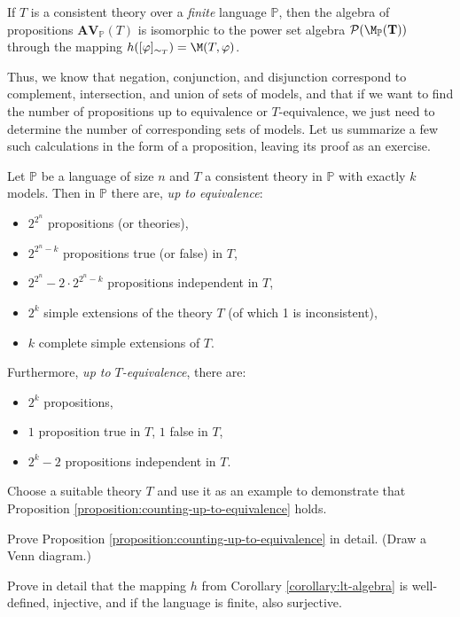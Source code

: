 \begin{corollary}\label{corollary:lt-algebra}
If $T$ is a consistent theory over a \emph{finite} language $\mathbb{P}$, then the algebra of propositions $\mathbf{AV}_\mathbb{P}(T)$ is isomorphic to the power set algebra $\mathbf{\mathcal{P}(\M_\mathbb{P}(T))}$ through the mapping $h([\varphi]_{\sim_T}) = \M(T,\varphi)$.
\end{corollary}

Thus, we know that negation, conjunction, and disjunction correspond to complement, intersection, and union of sets of models, and that if we want to find the number of propositions up to equivalence or $T$-equivalence, we just need to determine the number of corresponding sets of models. Let us summarize a few such calculations in the form of a proposition, leaving its proof as an exercise.

\begin{proposition}\label{proposition:counting-up-to-equivalence}
Let $\mathbb{P}$ be a language of size $n$ and $T$ a consistent theory in $\mathbb P$ with exactly $k$ models. Then in $\mathbb{P}$ there are, \emph{up to equivalence}:
\begin{itemize}
    \item $2^{2^n}$ propositions (or theories),
    \item $2^{2^n - k}$ propositions true (or false) in $T$,
    \item $2^{2^n} - 2 \cdot 2^{2^n - k}$ propositions independent in $T$,
    \item $2^k$ simple extensions of the theory $T$ (of which 1 is inconsistent),
    \item $k$ complete simple extensions of $T$.
\end{itemize}
Furthermore, \emph{up to $T$-equivalence}, there are:
\begin{itemize}
    \item $2^k$ propositions,
    \item $1$ proposition true in $T$, $1$ false in $T$,
    \item $2^k - 2$ propositions independent in $T$.
\end{itemize}
\end{proposition}

\begin{exercise}
    Choose a suitable theory $T$ and use it as an example to demonstrate that Proposition \ref{proposition:counting-up-to-equivalence} holds.
\end{exercise}

\begin{exercise}
    Prove Proposition \ref{proposition:counting-up-to-equivalence} in detail. (Draw a Venn diagram.)
\end{exercise}

\begin{exercise}
    Prove in detail that the mapping $h$ from Corollary \ref{corollary:lt-algebra} is well-defined, injective, and if the language is finite, also surjective.
\end{exercise}
